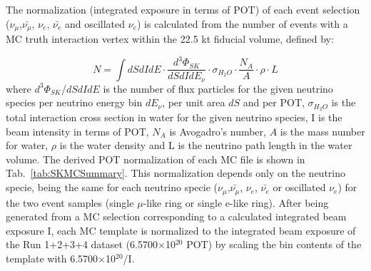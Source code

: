 The normalization (integrated exposure in terms of POT) of each event selection ($\nu_{\mu}$,$\bar{\nu_{\mu}}$, $\nu_{e}$, $\bar{\nu_{e}}$ and oscillated $\nu_{e}$) is calculated from the number of events with a MC truth interaction vertex within the 22.5 kt fiducial volume, defined by:

\begin{equation}
\displaystyle
  N = \int  dS dI dE \cdot
            \frac{d^{3}\Phi_{SK}}{dS dI dE_{\nu}} \cdot
            \sigma_{H_{2}O} \cdot
            \frac{N_{A}}{A} \cdot \rho \cdot L 
\end{equation}
where 
$d^{3}\Phi_{SK}$/$dS dI dE$ is the number of flux particles for the given neutrino species 
per neutrino energy bin $dE_{\nu}$, per unit area $dS$ and per POT,
$\sigma_{H_{2}O}$ is the total interaction cross section in water
for the given neutrino species,
I is the beam intensity in terms of POT,
$N_{A}$ is  Avogadro's number,
$A$ is the mass number for water,
$\rho$ is the water density
and L is the neutrino path length in the water volume.
The derived POT normalization of each MC file is shown in Tab.\ \ref{tab:SKMCSummary}.
This normalization depends only on the neutrino specie, being the same for each neutrino specie
($\nu_{\mu}$,$\bar{\nu_{\mu}}$, $\nu_{e}$, $\bar{\nu_{e}}$ or oscillated $\nu_{e}$) for the two event samples
(single $\mu$-like ring or single e-like ring).
After being generated from a MC selection corresponding to a calculated integrated beam exposure I,
each MC template is normalized to the integrated beam exposure of the Run 1+2+3+4 dataset (6.5700$\times$10$^{20}$ POT)
by scaling the bin contents of the template with 6.5700$\times$10$^{20}$/I.

